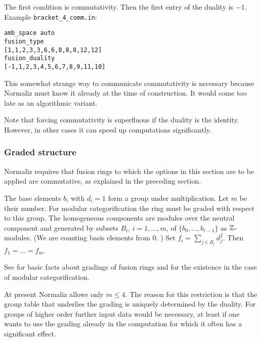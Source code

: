 The first condition is commutativity. Then the first entry of the duality is $-1$.  Example \verb*|bracket_4_comm.in|:
\begin{Verbatim}
amb_space auto
fusion_type
[1,1,2,3,3,6,6,8,8,8,12,12]
fusion_duality
[-1,1,2,3,4,5,6,7,8,9,11,10]
\end{Verbatim}
This somewhat strange way to communicate commutativity is necessary because Normaliz must know it already at the time of construction. It would come too late as an algorithmic variant.

Note that forcing commutativity is superfluous if the duality is the identity. However, in other cases it can speed up computations significantly. 

\subsubsection{Graded structure}

Normaliz requires that fusion rings to which the options in this section are to be applied are commutative, as explained in the preceding section.

The base elements $b_i$ with $d_i=1$ form a group under multiplication. Let $m$ be their number. For modular categorification the ring must be graded with respect to this group. The homogeneous components are modules over the neutral component and generated by subsets $B_i$, $i=1,\dots,m$, of $\{b_0,\dots,b_{r-1}\}$ as ${\mathbb Z}$-modules. (We are counting basis elements from $0$. ) Set $f_i = \sum_{j\in B_i} d_j^2$. Then  $f_1=\dots=f_m$.

See \cite[Section 3.5]{EGNO} for basic facts about gradings of fusion rings and \cite[8.22.9(iii), 4.14.3]{EGNO} for the existence in the case of modular categorification.

At present Normaliz allows only $m\le 4$. The reason for this restriction is that the group table that underlies the grading is uniquely determined by the duality. For groups of higher order further input data would be necessary, at least if one wants to use the grading already in the computation for which it often has a significant effect.

